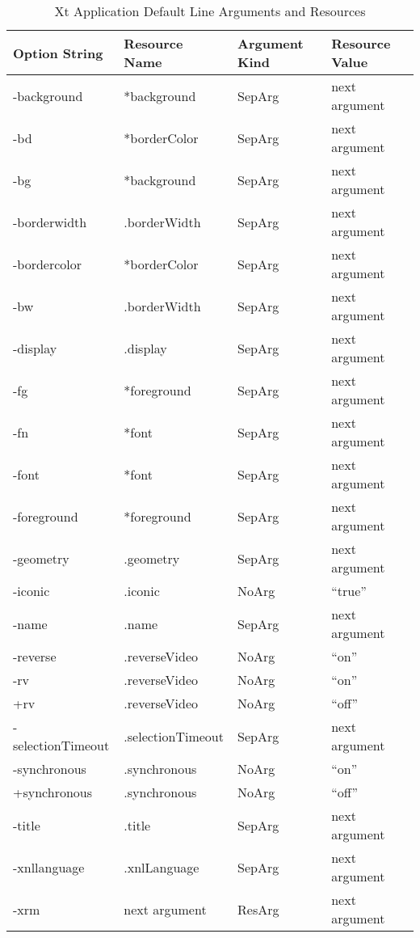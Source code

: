 \begin{table}
\begin{center}
\begin{tabular}{||l|l|l|l||}
\hline
Option String & Resource Name & Argument Kind & Resource Value \\
\hline
-background & *background   & SepArg    & next argument \\
-bd & *borderColor  & SepArg    & next argument \\
-bg & *background   & SepArg    & next argument \\
-borderwidth    & .borderWidth  & SepArg    & next argument \\
-bordercolor    & *borderColor  & SepArg    & next argument \\
-bw & .borderWidth  & SepArg    & next argument \\
-display    & .display  & SepArg    & next argument \\
-fg & *foreground   & SepArg    & next argument \\
-fn & *font     & SepArg    & next argument \\
-font   & *font     & SepArg    & next argument \\
-foreground & *foreground   & SepArg    & next argument \\
-geometry   & .geometry & SepArg    & next argument \\
-iconic & .iconic   & NoArg     & ``true'' \\
-name   & .name     & SepArg    & next argument \\
-reverse    & .reverseVideo     & NoArg     & ``on'' \\
-rv & .reverseVideo     & NoArg     & ``on'' \\
+rv & .reverseVideo     & NoArg     & ``off'' \\
-selectionTimeout   & .selectionTimeout & SepArg    & next argument \\
-synchronous    & .synchronous  & NoArg     & ``on'' \\
+synchronous    & .synchronous  & NoArg     & ``off'' \\
-title  & .title    & SepArg    & next argument \\
-xnllanguage    & .xnlLanguage  & SepArg    & next argument \\
-xrm    & next argument  & ResArg   &next argument \\
\hline
\end{tabular}
\end{center}
\caption{Xt Application Default Line Arguments and Resources}
\label{xt-args-table}
\end{table}

